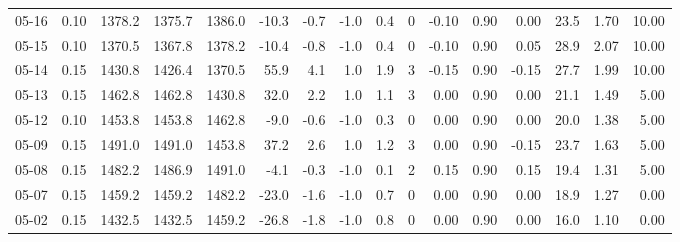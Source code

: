 \begin{threeparttable}
{\begin{tabular}{lrrrrrrrrrrrrrrr}
  05-16 &     0.10 & 1378.2 & 1375.7 & 1386.0 &      -10.3 &           -0.7 &                     -1.0 &                 0.4 &              0 &      -0.10 &      0.90 &           0.00 &             23.5 &            1.70 &                  10.00 \\
  05-15 &     0.10 & 1370.5 & 1367.8 & 1378.2 &      -10.4 &           -0.8 &                     -1.0 &                 0.4 &              0 &      -0.10 &      0.90 &           0.05 &             28.9 &            2.07 &                  10.00 \\
  05-14 &     0.15 & 1430.8 & 1426.4 & 1370.5 &       55.9 &            4.1 &                      1.0 &                 1.9 &              3 &      -0.15 &      0.90 &          -0.15 &             27.7 &            1.99 &                  10.00 \\
  05-13 &     0.15 & 1462.8 & 1462.8 & 1430.8 &       32.0 &            2.2 &                      1.0 &                 1.1 &              3 &       0.00 &      0.90 &           0.00 &             21.1 &            1.49 &                   5.00 \\
  05-12 &     0.10 & 1453.8 & 1453.8 & 1462.8 &       -9.0 &           -0.6 &                     -1.0 &                 0.3 &              0 &       0.00 &      0.90 &           0.00 &             20.0 &            1.38 &                   5.00 \\
  05-09 &     0.15 & 1491.0 & 1491.0 & 1453.8 &       37.2 &            2.6 &                      1.0 &                 1.2 &              3 &       0.00 &      0.90 &          -0.15 &             23.7 &            1.63 &                   5.00 \\
  05-08 &     0.15 & 1482.2 & 1486.9 & 1491.0 &       -4.1 &           -0.3 &                     -1.0 &                 0.1 &              2 &       0.15 &      0.90 &           0.15 &             19.4 &            1.31 &                   5.00 \\
  05-07 &     0.15 & 1459.2 & 1459.2 & 1482.2 &      -23.0 &           -1.6 &                     -1.0 &                 0.7 &              0 &       0.00 &      0.90 &           0.00 &             18.9 &            1.27 &                   0.00 \\
  05-02 &     0.15 & 1432.5 & 1432.5 & 1459.2 &      -26.8 &           -1.8 &                     -1.0 &                 0.8 &              0 &       0.00 &      0.90 &           0.00 &             16.0 &            1.10 &                   0.00 \\

\end{tabular}}
\end{threeparttable}
